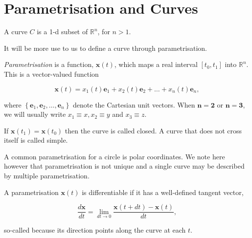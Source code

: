 
\section{Parametrisation and Curves}

\begin{definition}[Curve]
 A curve $C$ is a 1-d subset of $\mathbb{R}^n$, for $n>1$. 
\end{definition}

\noindent It will be more use to us to define a curve through parametrisation.

\begin{definition}[Parametrisation]
  \emph{Parametrisation} is a function, $\boldsymbol{x}(t)$, which maps a real interval $\left[t_0, t_1\right]$ into $\mathbb{R}^n$. This is a vector-valued function

$$
\boldsymbol{x}(t)=x_1(t) \boldsymbol{e}_1+x_2(t) \boldsymbol{e}_2+\ldots+x_n(t) \boldsymbol{e}_n,
$$

where $\left\{\boldsymbol{e}_1, \boldsymbol{e}_2, \ldots, \boldsymbol{e}_n\right\}$ denote the Cartesian unit vectors. When $\boldsymbol{n}=\mathbf{2}$ or $\boldsymbol{n}=\mathbf{3}$, we will usually write $x_1 \equiv x, x_2 \equiv y$ and $x_3 \equiv z$.
\end{definition}

\begin{definition}
  
If $\boldsymbol{x}\left(t_1\right)=\boldsymbol{x}\left(t_0\right)$ then the curve is called closed. A curve that does not cross itself is called simple.

\end{definition}

\begin{remark}
  A common parametrisation for a circle is polar coordinates. We note here however that parametrisation is not unique and a single curve may be described by multiple parametrisation.
\end{remark}

\begin{definition}
  A parametrisation $\boldsymbol{x}(t)$ is differentiable if it has a well-defined tangent vector,

$$
\frac{d \boldsymbol{x}}{d t}=\lim _{d t \rightarrow 0} \frac{\boldsymbol{x}(t+d t)-\boldsymbol{x}(t)}{d t},
$$

so-called because its direction points along the curve at each $t$.
\end{definition}

